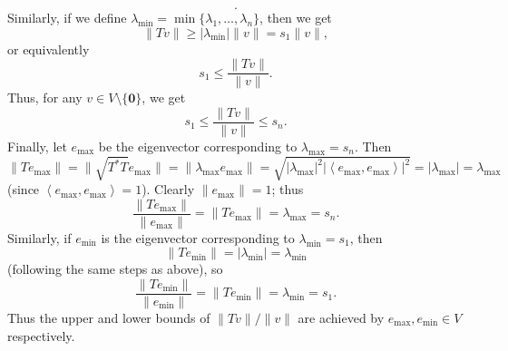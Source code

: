 \documentclass{homework}
\begin{document}
\begin{solution}
\[  .\] Similarly, if we define $\lambda_\text{min}=\min\{\lambda_1,\ldots,\lambda_n\}$, then we get \[
    \|Tv\|\ge \left| \lambda_\text{min} \right| \|v\|=s_1\|v\|
  ,\] or equivalently \[
    s_1\le \frac{\|Tv\|}{\|v\|}
  .\] Thus, for any $v\in V\setminus \{ \textbf{0} \}$, we get \[
    s_1\le \frac{\|Tv\|}{\|v\|}\le s_n
  .\] Finally, let $e_\text{max}$ be the eigenvector corresponding to $\lambda_{\text{max}}=s_n$.
  Then \[
    \|Te_\text{max}\|=\|\sqrt{T^*T}e_\text{max}\|=\|\lambda_{\text{max}}e_\text{max}\|=\sqrt{\left|
    \lambda_\text{max} \right| ^2\left| \left<e_\text{max},e_\text{max} \right>  \right| ^2}=\left|
    \lambda_\text{max} \right| =\lambda_\text{max}
  \] (since $\left<e_\text{max},e_\text{max} \right> =1$). Clearly $\|e_\text{max}\|=1$; thus \[
    \frac{\|Te_\text{max}\|}{\|e_\text{max}\|}=\|Te_\text{max}\|=\lambda_\text{max}=s_n
  .\] Similarly, if $e_\text{min}$ is the eigenvector corresponding to $\lambda_\text{min}=s_1$,
  then \[
    \|Te_\text{min}\|=\left| \lambda_\text{min} \right|=\lambda_\text{min}
  \] (following the same steps as above), so \[
    \frac{\|Te_\text{min}\|}{\|e_\text{min}\|}=\|Te_\text{min}\|=\lambda_\text{min}=s_1
  .\] Thus the upper and lower bounds of $\|Tv\|/\|v\|$ are achieved by $e_\text{max},e_\text{min}\in V$ respectively.
\end{solution}
\end{document}
